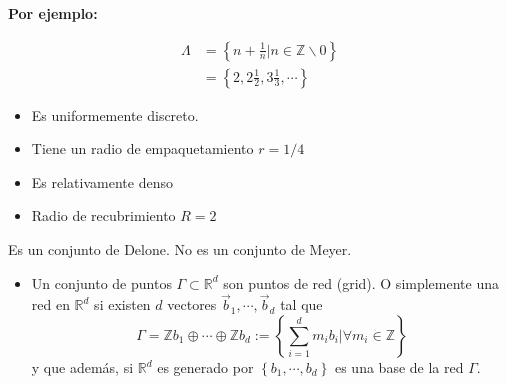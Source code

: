 \textbf{Por ejemplo:}

\begin{align*}
    \Lambda&=\left\{n+\frac{1}{n}\rvert n \in \mathbb{Z}\backslash 0\right\}\\
        &=\left\{2,2\frac{1}{2},3\frac{1}{3},\cdots\right\}
\end{align*}

\begin{itemize}
    \item Es uniformemente discreto.
    \item Tiene un radio de empaquetamiento $r=1/4$
    \item Es relativamente denso
    \item Radio de recubrimiento $R=2$
\end{itemize}

Es un conjunto de Delone.
No es un conjunto de Meyer.

\begin{itemize}
    \item Un conjunto de puntos $\Gamma \subset \mathbb{R}^d$ son puntos de red (grid). O simplemente una red en $\mathbb{R}^d$ si existen $d$ vectores $\vec{b}_1,\cdots,\vec{b}_d$ tal que
    $$
        \Gamma=\mathbb{Z}b_1\oplus\cdots\oplus\mathbb{Z}b_d:=\left\{\sum_{i=1}^dm_ib_i\lvert\forall m_i\in\mathbb{Z}\right\}
    $$
    y que además, si $\mathbb{R}^d$ es generado por $\left\{b_1,\cdots,b_d\right\}$ es una base de la red $\Gamma$.
\end{itemize}
